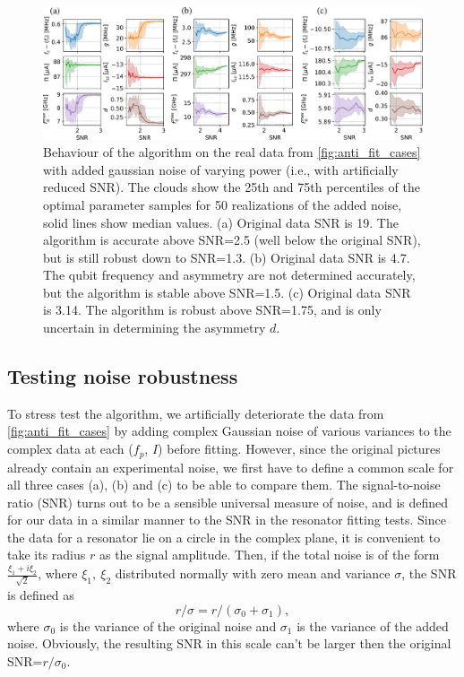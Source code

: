 \documentclass[%
 aip,
 amsmath,amssymb,
 reprint,%
]{revtex4-1}
\begin{document}
\begin{figure}
	\centering
	\includegraphics[width=\linewidth]{noise_test}
	\caption{Behaviour of the algorithm on the real data from \autoref{fig:anti_fit_cases} with added gaussian noise of varying power (i.e., with artificially reduced SNR). The clouds show the 25th and 75th percentiles of the optimal parameter samples for 50 realizations of the added noise, solid lines show median values. (a) Original data SNR is 19. The algorithm is accurate above SNR=2.5 (well below the original SNR), but is still robust down to SNR=1.3. (b) Original data SNR is 4.7. The qubit frequency and asymmetry are not determined accurately, but the algorithm is stable above SNR=1.5. (c) Original data SNR is 3.14. The algorithm is robust above SNR=1.75, and is only uncertain in determining the asymmetry $d$.}
	\label{fig:noise_test}
\end{figure}

\subsection{Testing noise robustness}

To stress test the algorithm, we artificially deteriorate the data from \autoref{fig:anti_fit_cases} by adding complex Gaussian noise of various variances to the complex data at each ($f_p$, $I$) before fitting. However, since the original pictures already contain an experimental noise, we first have to define a common scale for all three cases (a), (b) and (c) to be able to compare them. The signal-to-noise ratio (SNR) turns out to be a sensible universal measure of noise, and is defined for our data in a similar manner to the SNR in the resonator fitting tests\cite{probst2015}. Since the data for a resonator lie on a circle in the complex plane, it is convenient to take its radius $r$ as the signal amplitude. Then, if the total noise is of the form $\frac{\xi_1+i\xi_2}{\sqrt 2}$, where $\xi_1,\ \xi_2$ distributed normally with zero mean and variance $\sigma$, the SNR is defined as 
\begin{equation}
r/\sigma = r/(\sigma_0+\sigma_1),
\label{eq:SNR}
\end{equation}
where $\sigma_0$ is the variance of the original noise and $\sigma_1$ is the variance of the added noise. Obviously, the resulting SNR in this scale can't be larger then the original SNR=$r/\sigma_0$. 
\end{document}
